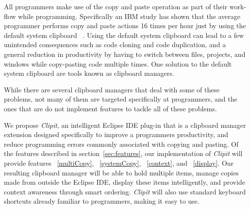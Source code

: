 \documentclass{acm_proc_article-sp}
\begin{document}
All programmers make use of the copy and paste operation as part of their work-flow while programming. Specifically an IBM study has shown that the average programmer performs copy and paste actions 16 times per hour just by using the default system clipboard ~\cite{ooplCP}. Using the default system clipboard can lead to a few unintended consequences such as code cloning and code duplication, and a general reduction in productivity by having to switch between files, projects, and windows while copy-pasting code multiple times. One solution to the default system clipboard are tools known as clipboard managers.

While there are several clipboard managers that deal with some of these problems, not many of them are targeted specifically at programmers, and the ones that are do not implement features to tackle all of these problems.

We propose \textit{Clipit}, an intelligent Eclipse IDE plug-in that is a clipboard manager extension designed specifically to improve a programmers productivity, and reduce programming errors commonly associated with copying and pasting. Of the features described in section~\ref{sec:features}, our implementation of \textit{Clipit} will provide features ~\ref{multiCopy}, ~\ref{systemCopy}, ~\ref{context}, and ~\ref{display}. Our resulting clipboard manager will be able to hold multiple items, manage copies made from outside the Eclipse IDE, display these items intelligently, and provide context awareness through smart ordering. \textit{Clipit} will also use standard keyboard shortcuts already familiar to programmers, making it easy to use.




\end{document}

